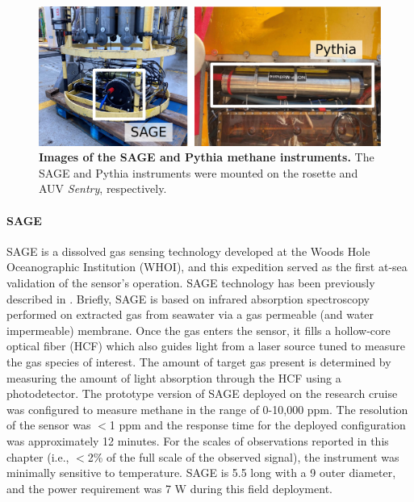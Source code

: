 \begin{figure}[h!]
    \centering
    \includegraphics[width=\columnwidth]{figures/chap3_methane_sensor_mounting.jpg}
    \caption[Images of SAGE and Pythia methane instruments]{\textbf{Images of the SAGE and Pythia methane instruments.} The SAGE and Pythia instruments were mounted on the rosette and AUV \emph{Sentry}, respectively.}
    \label{fig:sensor_mounting}
\end{figure}


\paragraph{SAGE}
\label{sec:sage}
SAGE is a dissolved gas sensing technology developed at the Woods Hole Oceanographic Institution (WHOI), and this expedition served as the first at-sea validation of the sensor’s operation. SAGE technology has been previously described in \cite{kapit2021dissolved, kapit2021measurement}. Briefly, SAGE is based on infrared absorption spectroscopy performed on extracted gas from seawater via a gas permeable (and water impermeable) membrane. Once the gas enters the sensor, it fills a hollow-core optical fiber (HCF) which also guides light from a laser source tuned to measure the gas species of interest. The amount of target gas present is determined by measuring the amount of light absorption through the HCF using a photodetector. The prototype version of SAGE deployed on the research cruise was configured to measure methane in the range of 0-10,000 ppm. The resolution of the sensor was $<$1 ppm and the response time for the deployed configuration was approximately 12 minutes. For the scales of observations reported in this chapter (i.e., $<$2\% of the full scale of the observed signal), the instrument was minimally sensitive to temperature. SAGE is \SI{5.5}{\inch} long with a \SI{9}{\inch} outer diameter, and the power requirement was 7 W during this field deployment.

